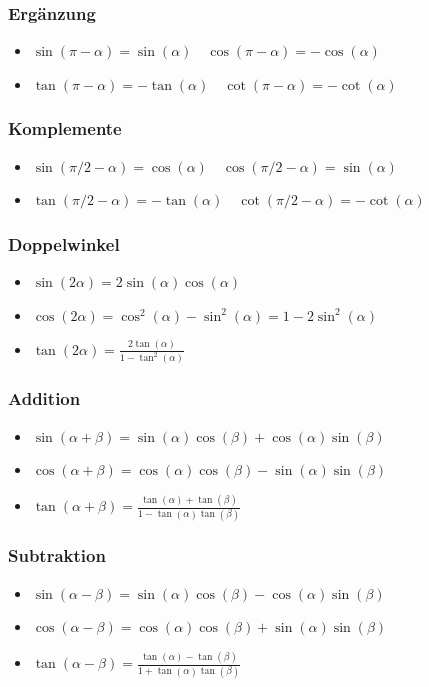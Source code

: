 \documentclass[8pt]{extarticle}
\begin{document}
\begin{multicols*}{3}
\subsubsection{Ergänzung}
\begin{itemize}
 \item $\sin(\pi - \alpha) = \sin(\alpha) \quad \cos(\pi - \alpha) = - \cos(\alpha)$
 \item $\tan(\pi - \alpha) = -\tan(\alpha) \quad \cot(\pi - \alpha) = - \cot(\alpha)$
\end{itemize}


\subsubsection{Komplemente}
\begin{itemize}
 \item $\sin(\pi/2 - \alpha) = \cos(\alpha) \quad \cos(\pi/2 - \alpha) = \sin(\alpha)$
 \item $\tan(\pi/2 - \alpha) = -\tan(\alpha) \quad \cot(\pi/2 - \alpha) = -\cot(\alpha)$
\end{itemize}

\subsubsection{Doppelwinkel}
\begin{itemize}
 \item $\sin(2\alpha) = 2 \sin(\alpha) \cos(\alpha)$
 \item $\cos(2\alpha) = \cos^2(\alpha) - \sin^2(\alpha) = 1 - 2 \sin^2(\alpha)$
 \item $\tan(2\alpha) = \frac{2\tan(\alpha)}{1 - \tan^2(\alpha)}$
\end{itemize}

\subsubsection{Addition}
\begin{itemize}
 \item $\sin(\alpha + \beta) = \sin(\alpha) \cos(\beta) + \cos(\alpha) \sin(\beta)$
 \item $\cos(\alpha + \beta) = \cos(\alpha) \cos(\beta) - \sin(\alpha) \sin(\beta)$
 \item $\tan(\alpha + \beta) = \frac{\tan(\alpha) + \tan(\beta)}{1 - \tan(\alpha) \tan(\beta)}$
\end{itemize}

\subsubsection{Subtraktion}
\begin{itemize}
 \item $\sin(\alpha - \beta) = \sin(\alpha) \cos(\beta) - \cos(\alpha)\sin(\beta)$
 \item $\cos(\alpha - \beta) = \cos(\alpha) \cos(\beta) + \sin(\alpha)\sin(\beta)$
 \item $\tan(\alpha - \beta) = \frac{\tan(\alpha) - \tan(\beta)}{1+\tan(\alpha) \tan(\beta)}$
\end{itemize}


\end{multicols*}
\end{document}
